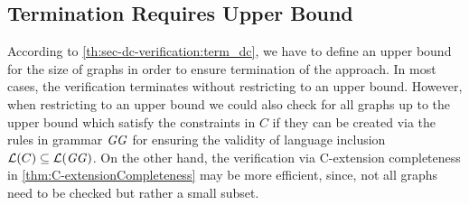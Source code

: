 \subsection{Termination Requires Upper Bound}

According to \cref{th:sec-dc-verification:term_dc}, we have to define an upper bound for the size of graphs in order to ensure termination of the approach.
In most cases, the verification terminates without restricting to an upper bound.
However, when restricting to an upper bound we could also check for all graphs up to the upper bound which satisfy the constraints in $C$ if they can be created via the rules in grammar $\mathit{GG}$ for ensuring the validity of language inclusion $\mathcal{L}(C) \subseteq \mathcal{L}(\mathit{GG})$.
On the other hand, the verification via C-extension completeness in \cref{thm:C-extensionCompleteness} may be more efficient, since, not all graphs need to be checked but rather a small subset.
